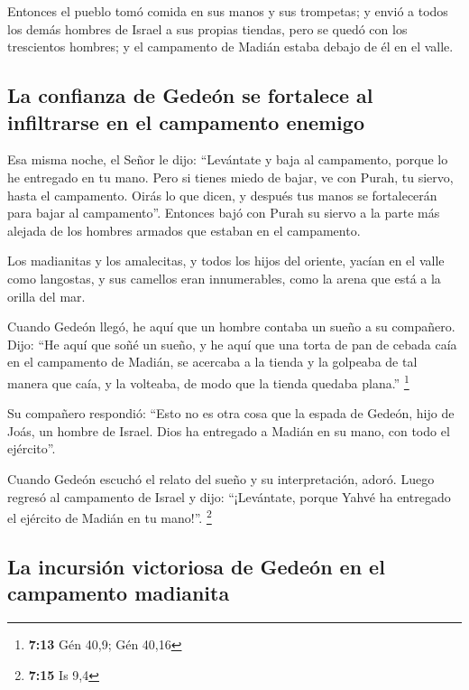  Entonces el pueblo tomó comida en sus manos y sus
trompetas; y envió a todos los demás hombres de Israel a sus propias
tiendas, pero se quedó con los trescientos hombres; y el campamento de
Madián estaba debajo de él en el valle.

\hypertarget{la-confianza-de-gedeuxf3n-se-fortalece-al-infiltrarse-en-el-campamento-enemigo}{%
\subsection{La confianza de Gedeón se fortalece al infiltrarse en el
campamento
enemigo}\label{la-confianza-de-gedeuxf3n-se-fortalece-al-infiltrarse-en-el-campamento-enemigo}}

 Esa misma noche, el Señor le dijo: ``Levántate y baja al
campamento, porque lo he entregado en tu mano.  Pero si
tienes miedo de bajar, ve con Purah, tu siervo, hasta el campamento.
 Oirás lo que dicen, y después tus manos se fortalecerán
para bajar al campamento''. Entonces bajó con Purah su siervo a la parte
más alejada de los hombres armados que estaban en el campamento.

 Los madianitas y los amalecitas, y todos los hijos del
oriente, yacían en el valle como langostas, y sus camellos eran
innumerables, como la arena que está a la orilla del mar.

 Cuando Gedeón llegó, he aquí que un hombre contaba un
sueño a su compañero. Dijo: ``He aquí que soñé un sueño, y he aquí que
una torta de pan de cebada caía en el campamento de Madián, se acercaba
a la tienda y la golpeaba de tal manera que caía, y la volteaba, de modo
que la tienda quedaba plana.'' \footnote{\textbf{7:13} Gén 40,9; Gén
  40,16}

 Su compañero respondió: ``Esto no es otra cosa que la
espada de Gedeón, hijo de Joás, un hombre de Israel. Dios ha entregado a
Madián en su mano, con todo el ejército''.

 Cuando Gedeón escuchó el relato del sueño y su
interpretación, adoró. Luego regresó al campamento de Israel y dijo:
``¡Levántate, porque Yahvé ha entregado el ejército de Madián en tu
mano!''. \footnote{\textbf{7:15} Is 9,4}

\hypertarget{la-incursiuxf3n-victoriosa-de-gedeuxf3n-en-el-campamento-madianita}{%
\subsection{La incursión victoriosa de Gedeón en el campamento
madianita}\label{la-incursiuxf3n-victoriosa-de-gedeuxf3n-en-el-campamento-madianita}}

